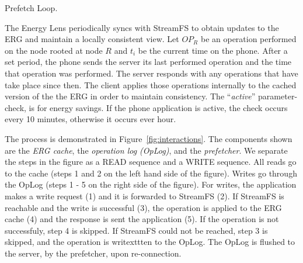 
\begin{algorithm}[h!]
 \SetAlgoLined
 \caption{Prefetch Loop.}
 \label{alg:prefetch}
\end{algorithm}


The Energy Lens periodically syncs with StreamFS to obtain updates to the ERG and maintain a locally consistent view.  
Let $OP_R$ be an operation performed on the node rooted at node $R$ and $t_i$ be the current time on the phone.  
After a set period, the phone sends the server
its last performed operation and the time that operation was performed.  The server responds with any operations that have
take place since then.  The client applies those operations internally to the cached version of the the ERG in order to 
maintain consistency.  The ``\emph{active}'' parameter-check, is for energy savings.  If the phone application is active, the
check occurs every 10 minutes, otherwise it occurs ever hour.

The process is demonstrated in Figure~\ref{fig:interactions}.  The components shown are the \emph{ERG cache}, the \emph{operation
log (OpLog)}, and the \emph{prefetcher}.  We separate the steps in the figure as a READ sequence and a WRITE sequence.
All reads go to the cache (steps 1 and 2 on the left hand side of the figure).  Writes go through the OpLog (steps 1 - 5 on the right
side of the figure).  For writes, 
the application makes a write request (1) and it is forwarded to StreamFS (2).  If StreamFS is reachable and the write is
successful (3), the operation is applied to the ERG cache (4) and the response is sent the application (5).
If the operation is not successfuly, step 4 is skipped.  If StreamFS could not be reached, step 3 is skipped, and the operation
is writexttten to the OpLog.  The OpLog is flushed to the server, by the prefetcher, upon re-connection. 

